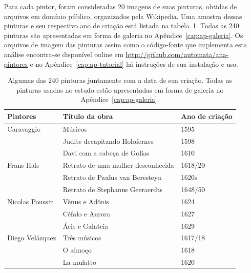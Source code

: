 Para cada pintor, foram consideradas 20 imagens de suas pinturas,
obtidas de arquivos em domínio público, organizados pela
Wikipedia. Uma amostra dessas pinturas e seu respectivo ano de criação
está listada na tabela~\ref{tab:paintings}. Todas as 240 pinturas são
apresentadas em forma de galeria no Apêndice~\ref{cap:ap-galeria}. Os
arquivos de imagem das pinturas assim como o código-fonte que
implementa esta análise encontra-se disponível online em
\url{http://github.com/automata/ana-pintores} e no
Apêndice~\ref{cap:ap-tutorial} há instruções de sua instalação e uso.

\begin{table} 
  \begin{center}
  \caption{\label{tab:paintings} Algumas das 240 pinturas juntamente
    com a data de sua criação. Todas as pinturas usadas no estudo
    estão apresentadas em forma de galeria no
    Apêndice~\ref{cap:ap-galeria}.}

\begin{tabular}{l|l|l}
\hline

 Pintores & Título da obra                       & Ano de criação \\ 
 
 \hline

 Caravaggio          & Músicos & 1595 \\
                     & Judite decapitando Holofernes & 1598 \\
                     & Davi com a cabeça de Golias & 1610 \\
                      
 Frans Hals          & Retrato de uma mulher desconhecida & 1618/20 \\
                     & Retrato de Paulus van Beresteyn & 1620s \\
                     & Retrato de Stephanus Geeraerdts & 1648/50 \\

 Nicolas Poussin     & Vênus e Adônis & 1624 \\
                     & Céfalo e Aurora & 1627 \\
                     & Ácis e Galateia & 1629 \\
 
 Diego Velázquez     & Três músicos & 1617/18 \\
                     & O almoço & 1618 \\
                     & La mulatto & 1620 \\
 

\end{tabular}
\end{center}
\end{table}
